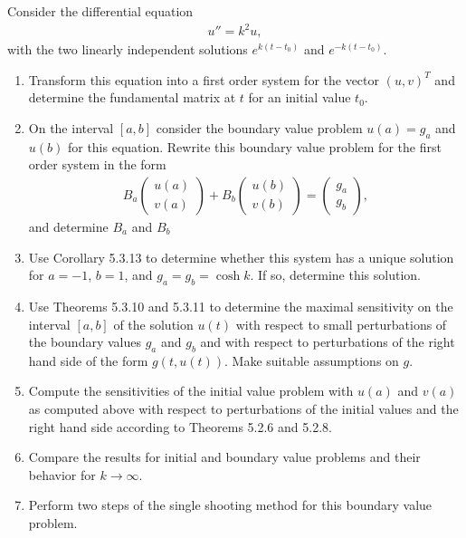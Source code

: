 \documentclass{article}
\begin{document}
Consider the differential equation
\begin{gather*}
  u'' = k^2 u,
\end{gather*}
with the two linearly independent solutions $e^{k(t-t_0)}$ and $e^{-k(t-t_0)}$.
\begin{enumerate}
\item Transform this equation into a first order system for the vector
  $(u,v)^T$ and determine the fundamental matrix at $t$ for an initial
  value $t_0$.
\item On the interval $[a,b]$ consider the boundary value problem
  $u(a) = g_a$ and $u(b)$ for this equation. Rewrite this boundary
  value problem for the first order system in the form
  \begin{gather*}
    B_a
    \begin{pmatrix}
      u(a) \\ v(a)      
    \end{pmatrix}
 + B_b 
    \begin{pmatrix}
      u(b) \\ v(b)      
    \end{pmatrix}
    =
    \begin{pmatrix}
      g_a\\g_b
    \end{pmatrix},
  \end{gather*}
  and determine $B_a$ and $B_b$
\item Use Corollary 5.3.13 to determine whether this system has a
  unique solution for $a=-1$, $b=1$, and $g_a = g_b = \cosh k$. If so,
  determine this solution.
\item Use Theorems 5.3.10 and 5.3.11 to determine the maximal
  sensitivity on the interval $[a,b]$ of the solution $u(t)$ with
  respect to small perturbations of the boundary values $g_a$ and
  $g_b$ and with respect to perturbations of the
  right hand side of the form $g(t,u(t))$. Make suitable assumptions
  on $g$.
\item Compute the sensitivities of the initial value problem with
  $u(a)$ and $v(a)$ as computed above with respect to perturbations of
  the initial values and the right hand side according to Theorems
  5.2.6 and 5.2.8.
\item Compare the results for initial and boundary value problems and
  their behavior for $k\to\infty$.
\item Perform two steps of the single shooting method for this
  boundary value problem.
\end{enumerate}
\end{document}

